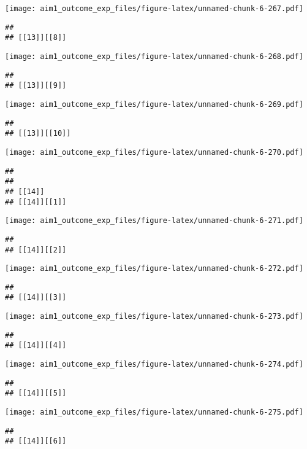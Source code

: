 \documentclass[
]{article}
\begin{document}
\texttt{[image: aim1\_outcome\_exp\_files/figure-latex/unnamed-chunk-6-267.pdf]}

\begin{verbatim}
## 
## [[13]][[8]]
\end{verbatim}

\texttt{[image: aim1\_outcome\_exp\_files/figure-latex/unnamed-chunk-6-268.pdf]}

\begin{verbatim}
## 
## [[13]][[9]]
\end{verbatim}

\texttt{[image: aim1\_outcome\_exp\_files/figure-latex/unnamed-chunk-6-269.pdf]}

\begin{verbatim}
## 
## [[13]][[10]]
\end{verbatim}

\texttt{[image: aim1\_outcome\_exp\_files/figure-latex/unnamed-chunk-6-270.pdf]}

\begin{verbatim}
## 
## 
## [[14]]
## [[14]][[1]]
\end{verbatim}

\texttt{[image: aim1\_outcome\_exp\_files/figure-latex/unnamed-chunk-6-271.pdf]}

\begin{verbatim}
## 
## [[14]][[2]]
\end{verbatim}

\texttt{[image: aim1\_outcome\_exp\_files/figure-latex/unnamed-chunk-6-272.pdf]}

\begin{verbatim}
## 
## [[14]][[3]]
\end{verbatim}

\texttt{[image: aim1\_outcome\_exp\_files/figure-latex/unnamed-chunk-6-273.pdf]}

\begin{verbatim}
## 
## [[14]][[4]]
\end{verbatim}

\texttt{[image: aim1\_outcome\_exp\_files/figure-latex/unnamed-chunk-6-274.pdf]}

\begin{verbatim}
## 
## [[14]][[5]]
\end{verbatim}

\texttt{[image: aim1\_outcome\_exp\_files/figure-latex/unnamed-chunk-6-275.pdf]}

\begin{verbatim}
## 
## [[14]][[6]]
\end{verbatim}
\end{document}
